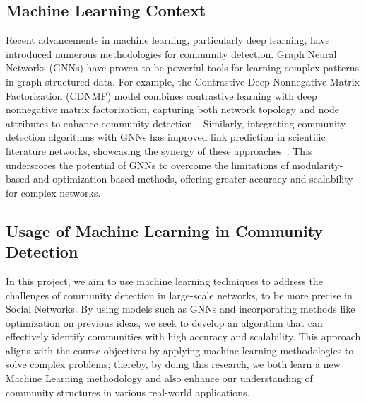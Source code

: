 \documentclass{article}
\begin{document}
\subsection{Machine Learning Context}
Recent advancements in machine learning, particularly deep learning, have introduced numerous methodologies for community detection. Graph Neural Networks (GNNs) have proven to be powerful tools for learning complex patterns in graph-structured data. For example, the Contrastive Deep Nonnegative Matrix Factorization (CDNMF) model combines contrastive learning with deep nonnegative matrix factorization, capturing both network topology and node attributes to enhance community detection~\cite{li2024contrastivedeepnonnegativematrix}. Similarly, integrating community detection algorithms with GNNs has improved link prediction in scientific literature networks, showcasing the synergy of these approaches~\cite{liu2024communitydetectiongraphneural}. This underscores the potential of GNNs to overcome the limitations of modularity-based and optimization-based methods, offering greater accuracy and scalability for complex networks.

\subsection{Usage of Machine Learning in Community Detection}
In this project, we aim to use machine learning techniques to address the challenges of community detection in large-scale networks, to be more precise in Social Networks. By using models such as GNNs and incorporating methods like optimization on previous ideas, we seek to develop an algorithm that can effectively identify communities with high accuracy and scalability. This approach aligns with the course objectives by applying machine learning methodologies to solve complex problems; thereby, by doing this research, we both learn a new Machine Learning methodology and also enhance our understanding of community structures in various real-world applications.
\end{document}
